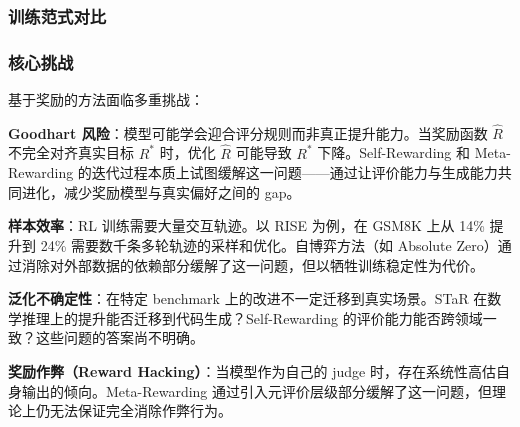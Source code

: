 \subsubsection{训练范式对比}

\begin{table}[htbp]
\centering
\caption{基于奖励的进化方法对比。}
\label{tab:reward-compare}
\end{table}

\subsubsection{核心挑战}

基于奖励的方法面临多重挑战：

\textbf{Goodhart 风险}：模型可能学会迎合评分规则而非真正提升能力。当奖励函数 $\hat{R}$ 不完全对齐真实目标 $R^*$ 时，优化 $\hat{R}$ 可能导致 $R^*$ 下降。Self-Rewarding 和 Meta-Rewarding 的迭代过程本质上试图缓解这一问题——通过让评价能力与生成能力共同进化，减少奖励模型与真实偏好之间的 gap。

\textbf{样本效率}：RL 训练需要大量交互轨迹。以 RISE 为例，在 GSM8K 上从 14\% 提升到 24\% 需要数千条多轮轨迹的采样和优化。自博弈方法（如 Absolute Zero）通过消除对外部数据的依赖部分缓解了这一问题，但以牺牲训练稳定性为代价。

\textbf{泛化不确定性}：在特定 benchmark 上的改进不一定迁移到真实场景。STaR 在数学推理上的提升能否迁移到代码生成？Self-Rewarding 的评价能力能否跨领域一致？这些问题的答案尚不明确。

\textbf{奖励作弊（Reward Hacking）}：当模型作为自己的 judge 时，存在系统性高估自身输出的倾向。Meta-Rewarding 通过引入元评价层级部分缓解了这一问题，但理论上仍无法保证完全消除作弊行为。

